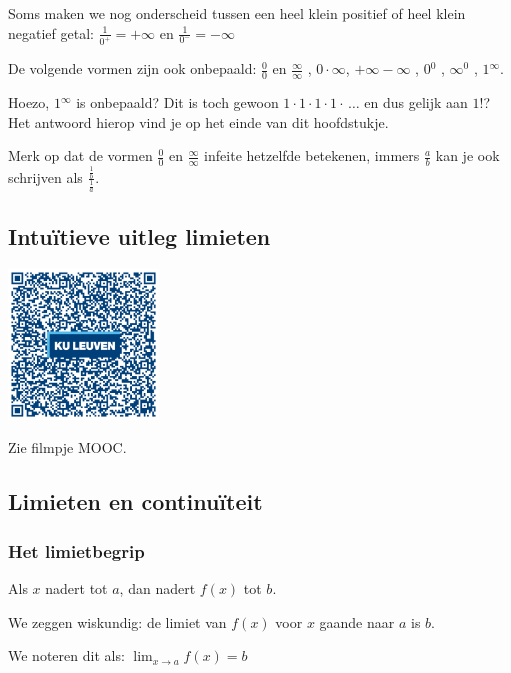 Soms maken we nog onderscheid tussen een heel klein positief
of heel klein negatief getal: $\frac{1}{0^{+}}=+\infty$ en $\frac{1}{0^{-}}=-\infty$




De volgende vormen zijn ook onbepaald: $\frac{0}{0}$ en
$\frac{\infty}{\infty}$ , $0\cdot \infty$, $+\infty-\infty$ , $0{}^{0}$
, $\infty{}^{0}$ , $1{}^{\infty}$.

Hoezo, $1{}^{\infty}$ is onbepaald? Dit is toch gewoon
$1\cdot 1\cdot 1\cdot 1\cdot \,\ldots$ en dus gelijk aan $1$!? Het antwoord hierop vind
je op het einde van dit hoofdstukje.

Merk op dat de vormen $\frac{0}{0}$ en $\frac{\infty}{\infty}$
infeite hetzelfde betekenen, immers $\frac{a}{b}$ kan je ook schrijven
als $\frac{\frac{1}{b}}{\frac{1}{a}}$.

\subsection{Intu\"itieve uitleg limieten}
\begin{minipage}{.25\linewidth}
	\raggedright
	\includegraphics[width=4cm]{2_elem_rekenvaardigheden_B/inputs/QR_Code_LIMIETEN_module2new}
\end{minipage}
\begin{minipage}{.7\linewidth}
	Zie filmpje MOOC.
\end{minipage}

\subsection{Limieten en continu\"iteit}

\subsubsection{Het limietbegrip}

Als $x$ nadert tot $a$, dan nadert $f(x)$ tot $b$.

We zeggen wiskundig: de limiet van $f(x)$ voor $x$ gaande
naar $a$ is $b$.

We noteren dit als: $\lim_{x\to a}f(x)=b$

